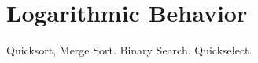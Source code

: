 
\section{Logarithmic Behavior}\label{sec:logbehavior}
Quicksort, Merge Sort. Binary Search. Quickselect.
